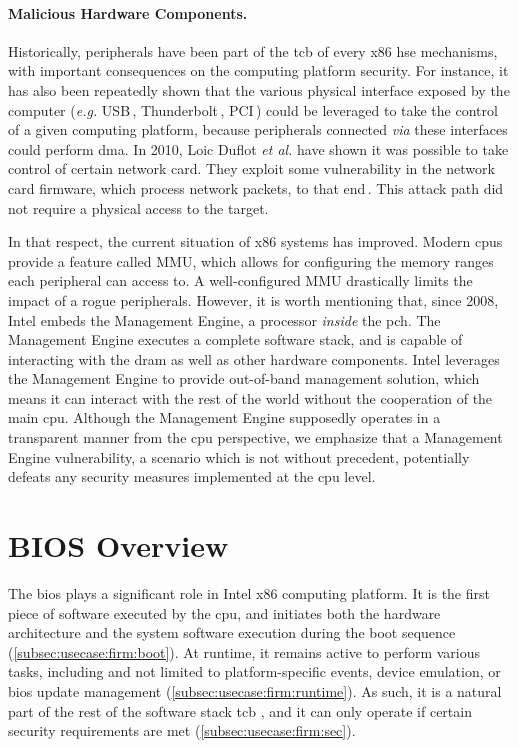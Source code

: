 \paragraph{Malicious Hardware Components.}
%
Historically, peripherals have been part of the \ac{tcb} of every x86 \ac{hse}
mechanisms, with important consequences on the computing platform security.
%
%
For instance, it has also been repeatedly shown that the various physical
interface exposed by the computer (\emph{e.g.} USB\,\cite{nohl2014badusb},
Thunderbolt\,\cite{hudson2015thunderstrike}, PCI\,\cite{chifflier2013uefi})
could be leveraged to take the control of a given computing platform, because
peripherals connected \emph{via} these interfaces could perform \ac{dma}.
%
In 2010, Loic Duflot \emph{et al.} have shown it was possible to take control of
certain network card.
%
They exploit some vulnerability in the network card firmware, which process
network packets, to that end\,\cite{duflot2010network}.
%
This attack path did not require a physical access to the target.

In that respect, the current situation of x86 systems has improved.
%
Modern \acp{cpu} provide a feature called \IO MMU, which allows
for configuring the memory ranges each peripheral can access to.
%
A well-configured \IO MMU drastically limits the impact of a rogue peripherals.
%
However, it is worth mentioning that, since 2008, Intel embeds the Management
Engine, a processor \emph{inside} the \ac{pch}.
%
The Management Engine executes a complete software stack, and is capable of
interacting with the \ac{dram} as well as other hardware components.
%
Intel leverages the Management Engine to provide out-of-band management
solution, which means it can interact with the rest of the world without the
cooperation of the main \ac{cpu}.
%
Although the Management Engine supposedly operates in a transparent manner from
the \ac{cpu} perspective, we emphasize that a Management Engine vulnerability, a
scenario which is not without precedent, potentially defeats any security
measures implemented at the \ac{cpu} level.

\section{BIOS Overview}
\label{sec:usecase:firmware}

The \ac{bios} plays a significant role in Intel x86 computing platform.
%
It is the first piece of software executed by the \ac{cpu}, and initiates both
the hardware architecture and the system software execution during the boot
sequence (\ref{subsec:usecase:firm:boot}).
%
At runtime, it remains active to perform various tasks, including and not
limited to platform-specific events, device emulation, or \ac{bios} update
management (\ref{subsec:usecase:firm:runtime}).
%
As such, it is a natural part of the rest of the software stack \ac{tcb}
, and it can only
operate if certain security requirements are met
(\ref{subsec:usecase:firm:sec}).

